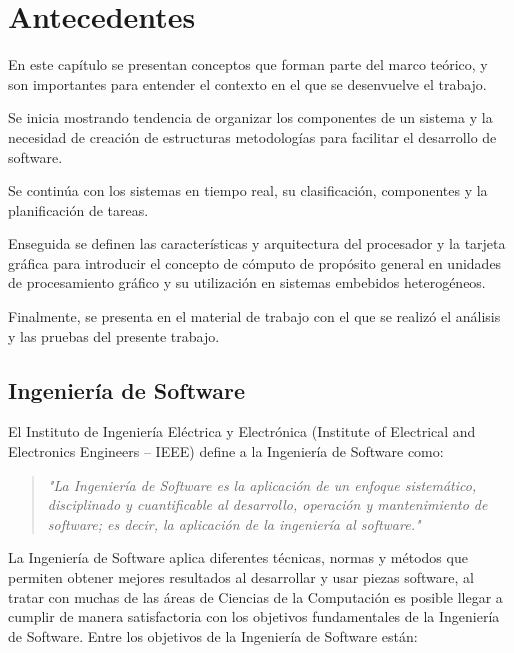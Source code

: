\chapter{Antecedentes}
    \label{cha:Antecedentes}

En este capítulo se presentan conceptos que forman parte del marco teórico, y son importantes para entender el contexto en el que se desenvuelve el trabajo. 
\newline

Se inicia mostrando tendencia de organizar los componentes de un sistema y la necesidad de creación de estructuras metodologías para facilitar el desarrollo de software. 

Se continúa con los sistemas en tiempo real, su clasificación, componentes y la planificación de tareas. 

Enseguida se definen las características y arquitectura del procesador y la tarjeta gráfica para introducir el concepto de cómputo de propósito general en unidades de procesamiento gráfico y su utilización en sistemas embebidos heterogéneos. 

Finalmente, se presenta en el material de trabajo con el que se realizó el análisis y las pruebas del presente trabajo.

     \section{Ingeniería de Software}

 El Instituto de Ingeniería Eléctrica y Electrónica (Institute of Electrical and Electronics Engineers – IEEE) define a la Ingeniería de Software como:

\begin{quote}
\textit{"La Ingeniería de Software es la aplicación de un enfoque sistemático, disciplinado y cuantificable al desarrollo, operación y mantenimiento de software; es decir, la aplicación de la ingeniería al software.\cite{IeeeSG}"}
\end{quote}

La Ingeniería de Software aplica diferentes técnicas, normas y métodos que permiten obtener mejores resultados al desarrollar y usar piezas software, al tratar con muchas de las áreas de Ciencias de la Computación es posible llegar a cumplir de manera satisfactoria con los objetivos fundamentales de la Ingeniería de Software. Entre los objetivos de la Ingeniería de Software están\cite{enSWE}:

